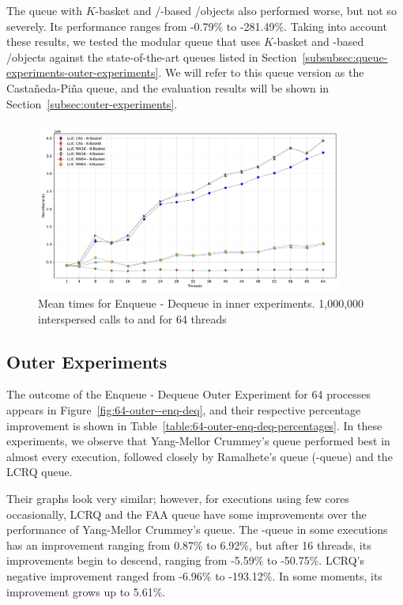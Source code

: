 The queue with \(K\)-basket and \R/\W-based \LL/\IC objects also performed worse, but not so severely. Its performance ranges from -0.79\% to -281.49\%. Taking into account these results, we tested the modular queue that uses \(K\)-basket and \CAS-based \LL/\IC objects against the state-of-the-art queues listed in Section~\ref{subsubsec:queue-experiments-outer-experiments}. We will refer to this queue version as the Castañeda-Piña queue, and the evaluation results will be shown in Section~\ref{subsec:outer-experiments}.

\begin{figure}[ht!]
  \centering
  \includegraphics[width=0.9\textwidth]{contents/figures/V_64_inner_enq_deq_all.pdf}
  \caption{\label{fig:64-inner-enq-deq} Mean times for Enqueue - Dequeue in inner experiments. 1,000,000 interspersed calls to \Enq and \Deq  for 64 threads}
\end{figure}

%



\subsection{\label{subsec:outer-experiments}Outer Experiments}

The outcome of the Enqueue - Dequeue Outer Experiment for 64 processes appears in Figure~\ref{fig:64-outer--enq-deq}, and their respective percentage improvement is shown in Table~\ref{table:64-outer-enq-deq-percentages}. In these experiments, we observe that Yang-Mellor Crummey's queue performed best in almost every execution, followed closely by Ramalhete's \FAI queue (\FAI-queue) and the LCRQ queue.


Their graphs look very similar; however, for executions using few cores occasionally, LCRQ and the FAA queue have some improvements over the performance of Yang-Mellor Crummey's queue. The \FAI-queue in some executions has an improvement ranging from 0.87\% to 6.92\%, but after 16 threads, its improvements begin to descend, ranging from -5.59\% to -50.75\%. LCRQ's negative improvement ranged from -6.96\% to -193.12\%. In some moments, its improvement grows up to 5.61\%.


